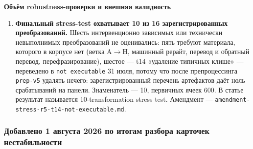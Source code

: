 \documentclass[11pt,a4paper]{article}
\renewcommand{\_}{\textunderscore\allowbreak}
\begin{document}
\textbf{Объём robustness-проверки и внешняя валидность}

\begin{enumerate}
\item[24.] \textbf{Финальный stress-test охватывает 10 из 16 зарегистрированных преобразований.} Шесть интервенционно зависимых или технически невыполнимых преобразований не оценивались: пять требуют материала, которого в корпусе нет (ветка A$\to$H, машинный рерайт, перевод и обратный перевод, перефразирование), шестое — t14 «удаление типичных клише» — переведено в \texttt{not executable} 31 июля, потому что после препроцессинга \texttt{prep-\allowbreak{}v5} удалять нечего: зарегистрированный перечень артефактов даёт ноль срабатываний на панели. Знаменатель — 10, первичных ячеек 600. В статье результат называется 10-transformation stress test. Амендмент — \texttt{amendment-\allowbreak{}stress-\allowbreak{}r5-\allowbreak{}t14-\allowbreak{}not-\allowbreak{}executable.md}.
\end{enumerate}

\subsubsection{Добавлено 1 августа 2026 по итогам разбора карточек нестабильности}
\end{document}
